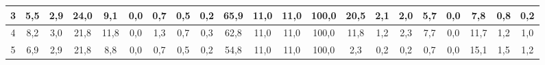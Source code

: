 \begin{sidewaystable}[]
\begin{tabular}{|c|c|c|c|c|c|c|c|c|c|c|c|c|c|c|c|c|c|c|c|c|}
    3  & 5,5                                              & 2,9                                              & 24,0                                             & 9,1                                              & 0,0                                              & 0,7                                              & 0,5                                              & 0,2                                              & 65,9                                            & 11,0                                            & 11,0                                            & 100,0                                           & 20,5                                            & 2,1                                             & 2,0                                             & 5,7                                             & 0,0                                             & 7,8                                              & 0,8                                              &  0,2                                               \\ \hline
    4  & 8,2                                              & 3,0                                              & 21,8                                             & 11,8                                             & 0,0                                              & 1,3                                              & 0,7                                              & 0,3                                              & 62,8                                            & 11,0                                            & 11,0                                            & 100,0                                           & 11,8                                            & 1,2                                             & 2,3                                             & 7,7                                             & 0,0                                             & 11,7                                             & 1,2                                              &  1,0                                               \\ \hline
    5  & 6,9                                              & 2,9                                              & 21,8                                             & 8,8                                              & 0,0                                              & 0,7                                              & 0,5                                              & 0,2                                              & 54,8                                            & 11,0                                            & 11,0                                            & 100,0                                           & 2,3                                             & 0,2                                             & 0,2                                             & 0,7                                             & 0,0                                             & 15,1                                             & 1,5                                              &  1,2                                               \\ \hline

\end{tabular}
\end{sidewaystable}
